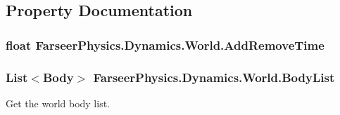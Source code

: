 \subsection{Property Documentation}
\hypertarget{class_farseer_physics_1_1_dynamics_1_1_world_aa82073926ea06b7f51ba3e0e428527b6}{
\subsubsection[{Add\+Remove\+Time}]{\setlength{\rightskip}{0pt plus 5cm}float Farseer\+Physics.\+Dynamics.\+World.\+Add\+Remove\+Time\hspace{0.3cm}{\ttfamily [get]}}}\label{class_farseer_physics_1_1_dynamics_1_1_world_aa82073926ea06b7f51ba3e0e428527b6}
\hypertarget{class_farseer_physics_1_1_dynamics_1_1_world_a5d727e7ad466b4773d13b46b391c4e18}{
\subsubsection[{Body\+List}]{\setlength{\rightskip}{0pt plus 5cm}List$<${\bf Body}$>$ Farseer\+Physics.\+Dynamics.\+World.\+Body\+List\hspace{0.3cm}{\ttfamily [get]}}}\label{class_farseer_physics_1_1_dynamics_1_1_world_a5d727e7ad466b4773d13b46b391c4e18}


Get the world body list. 

